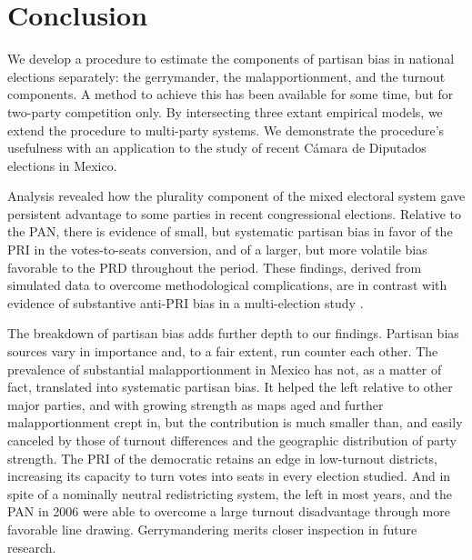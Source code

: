\documentclass[letter,12pt]{article}
\begin{document}
\section{Conclusion}

We develop a procedure to estimate the components of partisan bias in national elections separately: the gerrymander, the malapportionment, and the turnout components. A method to achieve this has been available for some time, but for two-party competition only. By intersecting three extant empirical models, we extend the procedure to multi-party systems. We demonstrate the procedure's usefulness with an application to the study of recent C\'amara de Diputados elections in Mexico. 

Analysis revealed how the plurality component of the mixed electoral system gave persistent advantage to some parties in recent congressional elections. Relative to the PAN, there is evidence of small, but systematic partisan bias in favor of the PRI in the votes-to-seats conversion, and of a larger, but more volatile bias favorable to the PRD throughout the period. These findings, derived from simulated data to overcome methodological complications, are in contrast with evidence of substantive anti-PRI bias in a multi-election study \citep{marquez2014biasBlog}. 

The breakdown of partisan bias adds further depth to our findings. Partisan bias sources vary in importance and, to a fair extent, run counter each other. The prevalence of substantial malapportionment in Mexico has not, as a matter of fact, translated into systematic partisan bias. It helped the left relative to other major parties, and with growing strength as maps aged and further malapportionment crept in, but the contribution is much smaller than, and easily canceled by those of turnout differences and the geographic distribution of party strength. The PRI of the democratic retains an edge in low-turnout districts, increasing its capacity to turn votes into seats in every election studied. And in spite of a nominally neutral redistricting system, the left in most years, and the PAN in 2006 were able to overcome a large turnout disadvantage through more favorable line drawing. Gerrymandering merits closer inspection in future research. 


\end{document}
